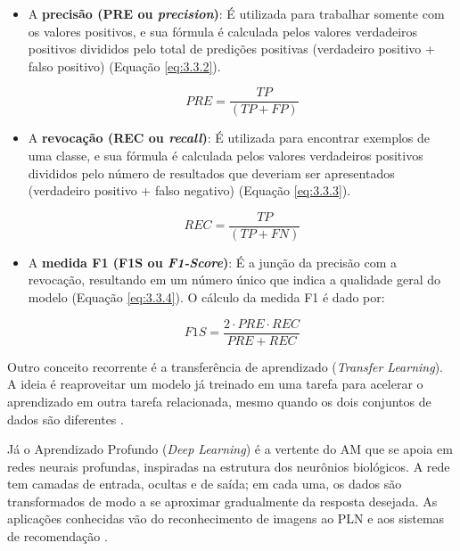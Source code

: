 \begin{itemize}
    \item A \textbf{precisão (PRE ou \textit{precision})}: É utilizada para trabalhar somente com os valores positivos, e sua fórmula é calculada pelos valores verdadeiros positivos divididos pelo total de predições positivas (verdadeiro positivo + falso positivo) (Equação \ref{eq:3.3.2}).
    
    \begin{equation}
        PRE = \frac {TP} {(TP + FP)}
        \label{eq:3.3.2}
    \end{equation}

    \item A \textbf{revocação (REC ou \textit{recall})}: É utilizada para encontrar exemplos de uma classe, e sua fórmula é calculada pelos valores verdadeiros positivos divididos pelo número de resultados que deveriam ser apresentados (verdadeiro positivo + falso negativo) (Equação \ref{eq:3.3.3}).
    
    \begin{equation}
        REC = \frac {TP} {(TP + FN)}
        \label{eq:3.3.3}
    \end{equation}

    \item A \textbf{medida F1 (F1S ou \textit{F1-Score})}: É a junção da precisão com a revocação, resultando em um número único que indica a qualidade geral do modelo (Equação \ref{eq:3.3.4}). O cálculo da medida F1 é dado por:
    
    \begin{equation}
        F1S = \frac {2 \cdot PRE \cdot REC} {PRE + REC}
        \label{eq:3.3.4}
    \end{equation}
\end{itemize}

Outro conceito recorrente é a transferência de aprendizado (\textit{Transfer Learning}). A ideia é reaproveitar um modelo já treinado em uma tarefa para acelerar o aprendizado em outra tarefa relacionada, mesmo quando os dois conjuntos de dados são diferentes \cite{shao2015}.

Já o Aprendizado Profundo (\textit{Deep Learning}) é a vertente do AM que se apoia em redes neurais profundas, inspiradas na estrutura dos neurônios biológicos. A rede tem camadas de entrada, ocultas e de saída; em cada uma, os dados são transformados de modo a se aproximar gradualmente da resposta desejada. As aplicações conhecidas vão do reconhecimento de imagens ao PLN e aos sistemas de recomendação \cite{goodfellow2016,schmidhuber2015}.


